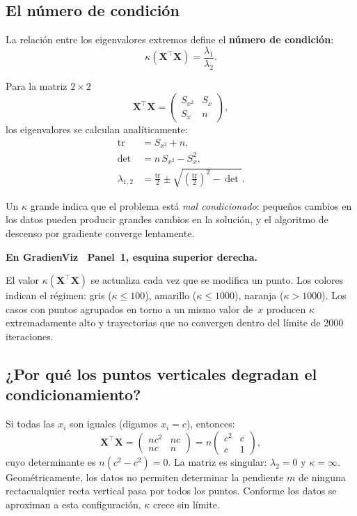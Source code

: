 \documentclass[12pt, a4paper]{article}
\newenvironment{viznota}[1]{%
  \begin{mdframed}[style=vizverde]
  \textbf{\color{bordeteo}En GradienViz \textemdash\ #1.}\quad
}{%
  \end{mdframed}
}
\newcommand{\XtX}{\mathbf{X}^{\top}\mathbf{X}}
\begin{document}
\subsection{El número de condición}

La relación entre los eigenvalores extremos define el \textbf{número de condición}:
\begin{equation}\label{eq:kappa}
  \kappa(\XtX) = \frac{\lambda_1}{\lambda_2}.
\end{equation}

Para la matriz $2\times 2$
\[
  \XtX = \begin{pmatrix} S_{x^2} & S_x \\ S_x & n \end{pmatrix},
\]
los eigenvalores se calculan analíticamente:
\begin{align*}
  \text{tr} &= S_{x^2} + n, \\
  \det &= n\,S_{x^2} - S_x^2, \\
  \lambda_{1,2} &= \frac{\text{tr}}{2} \pm
    \sqrt{\left(\frac{\text{tr}}{2}\right)^2 - \det}.
\end{align*}

Un $\kappa$ grande indica que el problema está \emph{mal condicionado}:
pequeños cambios en los datos pueden producir grandes cambios en la solución,
y el algoritmo de descenso por gradiente converge lentamente.

\begin{viznota}{Panel~1, esquina superior derecha}
El valor $\kappa(\XtX)$ se actualiza cada vez que se modifica un punto.
Los colores indican el régimen: gris ($\kappa \leq 100$), amarillo ($\kappa \leq 1000$),
naranja ($\kappa > 1000$). Los casos con puntos agrupados en torno a un mismo
valor de~$x$ producen $\kappa$ extremadamente alto y trayectorias que no convergen
dentro del límite de 2000 iteraciones.
\end{viznota}

\subsection{¿Por qué los puntos verticales degradan el condicionamiento?}

Si todas las $x_i$ son iguales (digamos $x_i = c$), entonces:
\[
  \XtX = \begin{pmatrix} nc^2 & nc \\ nc & n \end{pmatrix}
       = n \begin{pmatrix} c^2 & c \\ c & 1 \end{pmatrix},
\]
cuyo determinante es $n(c^2 - c^2) = 0$. La matriz es singular: $\lambda_2 = 0$
y $\kappa = \infty$. Geométricamente, los datos no permiten determinar la pendiente
$m$ de ninguna recta\textemdash cualquier recta vertical pasa por todos los puntos.
Conforme los datos se aproximan a esta configuración, $\kappa$ crece sin límite.
\end{document}
